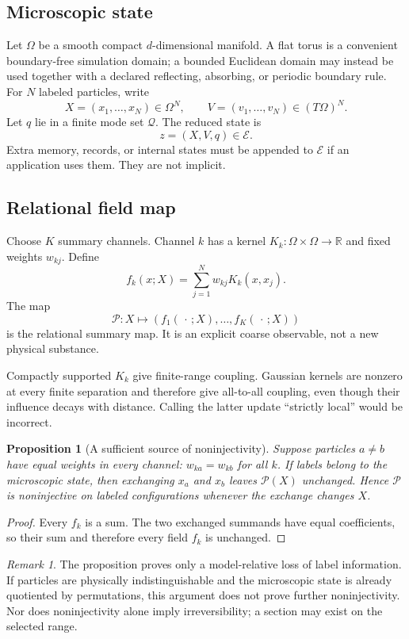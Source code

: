 \documentclass[11pt]{article}
\newtheorem{proposition}[theorem]{Proposition}
\theoremstyle{definition}
\theoremstyle{remark}
\newtheorem{remark}[theorem]{Remark}
\newcommand{\cE}{\mathcal E}
\newcommand{\cP}{\mathcal P}
\newcommand{\cQ}{\mathcal Q}
\begin{document}
\subsection{Microscopic state}

Let $\Omega$ be a smooth compact $d$-dimensional manifold.  A flat torus is
a convenient boundary-free simulation domain; a bounded Euclidean domain
may instead be used together with a declared reflecting, absorbing, or
periodic boundary rule.  For $N$ labeled particles, write
\[
 X=(x_1,\ldots,x_N)\in\Omega^N,
 \qquad
 V=(v_1,\ldots,v_N)\in(T\Omega)^N.
\]
Let $q$ lie in a finite mode set $\cQ$.  The reduced state is
\[
 z=(X,V,q)\in\cE.
\]
Extra memory, records, or internal states must be appended to $\cE$ if an
application uses them.  They are not implicit.

\subsection{Relational field map}

Choose $K$ summary channels.  Channel $k$ has a kernel
$K_k:\Omega\times\Omega\to\mathbb R$ and fixed weights $w_{kj}$.  Define
\[
 f_k(x;X)=\sum_{j=1}^{N}w_{kj}K_k(x,x_j).
\]
The map
\[
 \cP:X\longmapsto(f_1(\,\cdot\,;X),\ldots,f_K(\,\cdot\,;X))
\]
is the relational summary map.  It is an explicit coarse observable, not a
new physical substance.

Compactly supported $K_k$ give finite-range coupling.  Gaussian kernels
are nonzero at every finite separation and therefore give all-to-all
coupling, even though their influence decays with distance.  Calling the
latter update ``strictly local'' would be incorrect.

\begin{proposition}[A sufficient source of noninjectivity]
\label{prop:noninjective}
Suppose particles $a\ne b$ have equal weights in every channel:
$w_{ka}=w_{kb}$ for all $k$.  If labels belong to the microscopic state,
then exchanging $x_a$ and $x_b$ leaves $\cP(X)$ unchanged.  Hence $\cP$ is
noninjective on labeled configurations whenever the exchange changes $X$.
\end{proposition}

\begin{proof}
Every $f_k$ is a sum.  The two exchanged summands have equal coefficients,
so their sum and therefore every field $f_k$ is unchanged.
\end{proof}

\begin{remark}
The proposition proves only a model-relative loss of label information.
If particles are physically indistinguishable and the microscopic state is
already quotiented by permutations, this argument does not prove further
noninjectivity.  Nor does noninjectivity alone imply irreversibility; a
section may exist on the selected range.
\end{remark}
\end{document}
